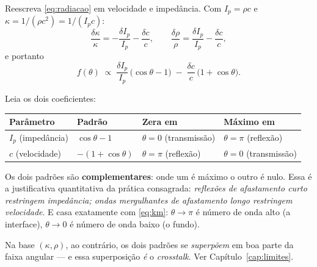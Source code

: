 \documentclass[11pt,a4paper,oneside]{report}
\begin{document}
\begin{teoria}
Reescreva \eqref{eq:radiacao} em velocidade e imped\^ancia. Com
$I_p = \rho c$ e $\kappa = 1/(\rho c^{2}) = 1/(I_p c)$:
\[
\frac{\delta\kappa}{\kappa} = -\frac{\delta I_p}{I_p} - \frac{\delta c}{c},
\qquad
\frac{\delta\rho}{\rho} = \frac{\delta I_p}{I_p} - \frac{\delta c}{c},
\]
e portanto
\begin{equation}
f(\theta) \;\propto\;
 \frac{\delta I_p}{I_p}\,\bigl(\cos\theta - 1\bigr)
 \;-\; \frac{\delta c}{c}\,\bigl(1 + \cos\theta\bigr).
\label{eq:radiacao_Ic}
\end{equation}

Leia os dois coeficientes:
\begin{center}
\begin{tabular}{@{}llll@{}}
\toprule
\textbf{Par\^ametro} & \textbf{Padr\~ao} & \textbf{Zera em}
& \textbf{M\'aximo em} \\
\midrule
$I_p$ (imped\^ancia) & $\cos\theta - 1$ & $\theta = 0$ (transmiss\~ao)
  & $\theta = \pi$ (reflex\~ao) \\
$c$ (velocidade) & $-(1+\cos\theta)$ & $\theta = \pi$ (reflex\~ao)
  & $\theta = 0$ (transmiss\~ao) \\
\bottomrule
\end{tabular}
\end{center}

Os dois padr\~oes s\~ao \textbf{complementares}: onde um \'e m\'aximo o outro
\'e nulo. Essa \'e a justificativa quantitativa da pr\'atica consagrada:
\emph{reflex\~oes de afastamento curto restringem imped\^ancia; ondas
mergulhantes de afastamento longo restringem velocidade}. E casa exatamente
com \eqref{eq:km}: $\theta \to \pi$ \'e n\'umero de onda alto (a interface),
$\theta\to 0$ \'e n\'umero de onda baixo (o fundo).

Na base $(\kappa,\rho)$, ao contr\'ario, os dois padr\~oes se \emph{superp\~oem}
em boa parte da faixa angular --- e essa superposi\c{c}\~ao \emph{\'e} o
\emph{crosstalk}. Ver Cap\'itulo~\ref{cap:limites}.
\end{teoria}
\end{document}
